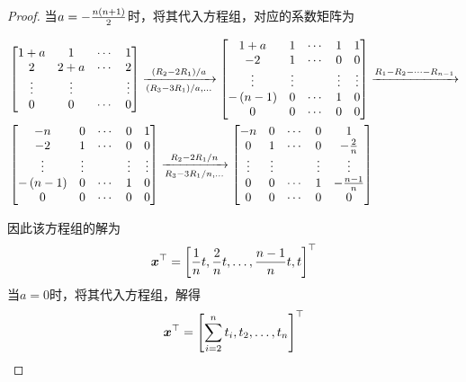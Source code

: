 \begin{proof}
    当\(a=-\frac{n\left( n+1 \right)}{2}\)时，将其代入方程组，对应的系数矩阵为
    \begin{small}
        \begin{align*}
             &
            \begin{bmatrix}
                1+a    & 1      & \cdots & 1      \\
                2      & 2+a    & \cdots & 2      \\
                \vdots & \vdots &        & \vdots \\
                0      & 0      & \cdots & 0
            \end{bmatrix}\xrightarrow[\left( R_3-3R_1 \right)/a,\dots]{\left( R_2-2R_1 \right)/a}
            \begin{bmatrix}
                1+a         & 1      & \cdots & 1      & 1      \\
                -2          & 1      & \cdots & 0      & 0      \\
                \vdots      & \vdots &        & \vdots & \vdots \\
                -\left( n-1 \right) & 0      & \cdots & 1      & 0      \\
                0           & 0      & \cdots & 0      & 0
            \end{bmatrix}\xrightarrow{R_1-R_2-\dots-R_{n-1}} \\
             &
            \begin{bmatrix}
                -n          & 0      & \cdots & 0      & 1      \\
                -2          & 1      & \cdots & 0      & 0      \\
                \vdots      & \vdots &        & \vdots & \vdots \\
                -\left( n-1 \right) & 0      & \cdots & 1      & 0      \\
                0           & 0      & \cdots & 0      & 0
            \end{bmatrix}\xrightarrow[R_3-3R_1/n,\dots]{R_2-2R_1/n}
            \begin{bmatrix}
                -n     & 0      & \cdots & 0      & 1              \\
                0      & 1      & \cdots & 0      & -\frac{2}{n}   \\
                \vdots & \vdots &        & \vdots & \vdots         \\
                0      & 0      & \cdots & 1      & -\frac{n-1}{n} \\
                0      & 0      & \cdots & 0      & 0
            \end{bmatrix}
        \end{align*}
    \end{small}
    因此该方程组的解为
    \begin{equation*}
        \boldsymbol{x}^\top=\left[ \frac{1}{n}t,\frac{2}{n}t,\dots,\frac{n-1}{n}t,t \right]^\top
    \end{equation*}
    当\(a=0\)时，将其代入方程组，解得
    \begin{equation*}
        \boldsymbol{x}^\top=\left[ \sum_{i=2}^{n}t_i,t_2,\dots,t_n \right]^\top
    \end{equation*}
\end{proof}

